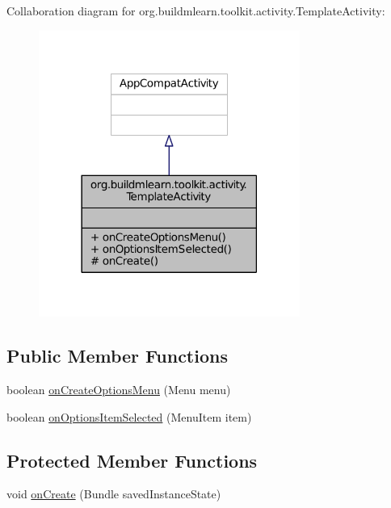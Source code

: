 Collaboration diagram for org.\-buildmlearn.\-toolkit.\-activity.\-Template\-Activity\-:
\nopagebreak
\begin{figure}[H]
\begin{center}
\leavevmode
\includegraphics[width=242pt]{db/dc2/classorg_1_1buildmlearn_1_1toolkit_1_1activity_1_1TemplateActivity__coll__graph}
\end{center}
\end{figure}
\subsection*{Public Member Functions}
\begin{DoxyCompactItemize}
\item 
boolean \hyperlink{classorg_1_1buildmlearn_1_1toolkit_1_1activity_1_1TemplateActivity_aa4a2a52e7548ca9b54a353420f79ff75}{on\-Create\-Options\-Menu} (Menu menu)
\item 
boolean \hyperlink{classorg_1_1buildmlearn_1_1toolkit_1_1activity_1_1TemplateActivity_a93ae9651ee39cf090f15caac413e9892}{on\-Options\-Item\-Selected} (Menu\-Item item)
\end{DoxyCompactItemize}
\subsection*{Protected Member Functions}
\begin{DoxyCompactItemize}
\item 
void \hyperlink{classorg_1_1buildmlearn_1_1toolkit_1_1activity_1_1TemplateActivity_a0bef4534d603cda941537d9527010576}{on\-Create} (Bundle saved\-Instance\-State)
\end{DoxyCompactItemize}


